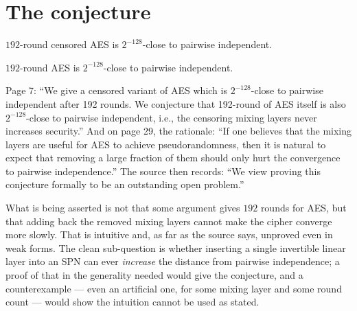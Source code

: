 \documentclass{aicr-conjecture}
\begin{document}
\section{The conjecture}\label{sec:conjectures}

\begin{theorem}\label{thm:censored}
$192$-round censored AES is $2^{-128}$-close to pairwise independent.
\end{theorem}

\begin{conjecture}\label{conj:main}
$192$-round AES is $2^{-128}$-close to pairwise independent.
\end{conjecture}

\begin{remark}\label{rem:quote}
Page 7: ``We give a censored variant of AES which is $2^{-128}$-close to
pairwise independent after 192 rounds. We conjecture that 192-round of
AES itself is also $2^{-128}$-close to pairwise independent, i.e., the
censoring mixing layers never increases security.'' And on page 29, the
rationale: ``If one believes that the mixing layers are useful for AES to
achieve pseudorandomness, then it is natural to expect that removing a
large fraction of them should only hurt the convergence to pairwise
independence.'' The source then records: ``We view proving this
conjecture formally to be an outstanding open problem.''
\end{remark}

\begin{remark}\label{rem:monotone}
What is being asserted is not that some argument gives $192$ rounds for
AES, but that adding back the removed mixing layers cannot make the
cipher converge more slowly. That is intuitive and, as far as the source
says, unproved even in weak forms. The clean sub-question is whether
inserting a single invertible linear layer into an SPN can ever
\emph{increase} the distance from pairwise independence; a proof of that
in the generality needed would give the conjecture, and a counterexample
--- even an artificial one, for some mixing layer and some round count ---
would show the intuition cannot be used as stated.
\end{remark}
\end{document}
